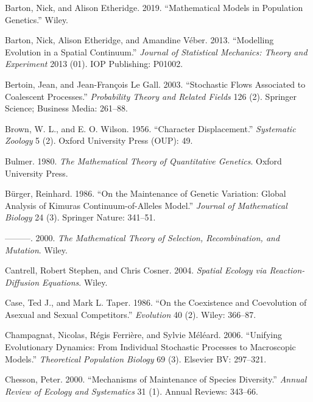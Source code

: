 \documentclass[]{article}
\begin{document}
\leavevmode\hypertarget{ref-Barton2019}{}%
Barton, Nick, and Alison Etheridge. 2019. ``Mathematical Models in
Population Genetics.'' Wiley.

\leavevmode\hypertarget{ref-Barton2013}{}%
Barton, Nick, Alison Etheridge, and Amandine Véber. 2013. ``Modelling
Evolution in a Spatial Continuum.'' \emph{Journal of Statistical
Mechanics: Theory and Experiment} 2013 (01). IOP Publishing: P01002.

\leavevmode\hypertarget{ref-Bertoin2003}{}%
Bertoin, Jean, and Jean-François Le Gall. 2003. ``Stochastic Flows
Associated to Coalescent Processes.'' \emph{Probability Theory and
Related Fields} 126 (2). Springer Science; Business Media: 261--88.

\leavevmode\hypertarget{ref-Brown1956}{}%
Brown, W. L., and E. O. Wilson. 1956. ``Character Displacement.''
\emph{Systematic Zoology} 5 (2). Oxford University Press (OUP): 49.

\leavevmode\hypertarget{ref-bulmer1980}{}%
Bulmer. 1980. \emph{The Mathematical Theory of Quantitative Genetics}.
Oxford University Press.

\leavevmode\hypertarget{ref-Brger1986}{}%
Bürger, Reinhard. 1986. ``On the Maintenance of Genetic Variation:
Global Analysis of Kimuras Continuum-of-Alleles Model.'' \emph{Journal
of Mathematical Biology} 24 (3). Springer Nature: 341--51.

\leavevmode\hypertarget{ref-9780471986539}{}%
---------. 2000. \emph{The Mathematical Theory of Selection,
Recombination, and Mutation}. Wiley.

\leavevmode\hypertarget{ref-Cantrell2004}{}%
Cantrell, Robert Stephen, and Chris Cosner. 2004. \emph{Spatial Ecology
via Reaction-Diffusion Equations}. Wiley.

\leavevmode\hypertarget{ref-Case1986}{}%
Case, Ted J., and Mark L. Taper. 1986. ``On the Coexistence and
Coevolution of Asexual and Sexual Competitors.'' \emph{Evolution} 40
(2). Wiley: 366--87.

\leavevmode\hypertarget{ref-Champagnat2006}{}%
Champagnat, Nicolas, Régis Ferrière, and Sylvie Méléard. 2006.
``Unifying Evolutionary Dynamics: From Individual Stochastic Processes
to Macroscopic Models.'' \emph{Theoretical Population Biology} 69 (3).
Elsevier BV: 297--321.

\leavevmode\hypertarget{ref-Chesson2000}{}%
Chesson, Peter. 2000. ``Mechanisms of Maintenance of Species
Diversity.'' \emph{Annual Review of Ecology and Systematics} 31 (1).
Annual Reviews: 343--66.
\end{document}
